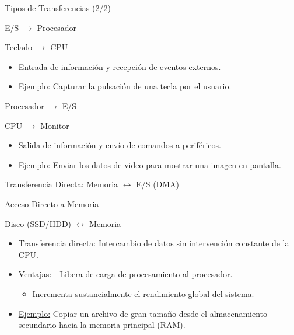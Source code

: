 \documentclass[presentation]{beamer}
\begin{document}
\begin{frame}[allowframebreaks]{Tipos de Transferencias (2/2)}
\begin{block}{E/S \(\rightarrow\) Procesador}
\begin{center}
\alert{Teclado} \(\longrightarrow\) \alert{CPU}
\end{center}
\begin{itemize}
\item Entrada de información y recepción de eventos externos.
\item \uline{Ejemplo:} Capturar la pulsación de una tecla por el usuario.
\end{itemize}
\end{block}

\begin{block}{Procesador \(\rightarrow\) E/S}
\begin{center}
\alert{CPU} \(\longrightarrow\) \alert{Monitor}
\end{center}
\begin{itemize}
\item Salida de información y envío de comandos a periféricos.
\item \uline{Ejemplo:} Enviar los datos de video para mostrar una imagen en pantalla.
\end{itemize}
\end{block}
\end{frame}

\begin{frame}[label={sec:org43bfd63}]{Transferencia Directa: Memoria \(\leftrightarrow\) E/S (DMA)}
\begin{block}{Acceso Directo a Memoria}
\begin{center}
\alert{Disco (SSD/HDD)} \(\longleftrightarrow\) \alert{Memoria}
\end{center}
\begin{itemize}
\item \alert{Transferencia directa:} Intercambio de datos sin intervención constante de la CPU.
\item \alert{Ventajas:} - Libera de carga de procesamiento al procesador.
\begin{itemize}
\item Incrementa sustancialmente el rendimiento global del sistema.
\end{itemize}
\item \uline{Ejemplo:} Copiar un archivo de gran tamaño desde el almacenamiento secundario hacia la memoria principal (RAM).
\end{itemize}
\end{block}
\end{frame}
\end{document}
